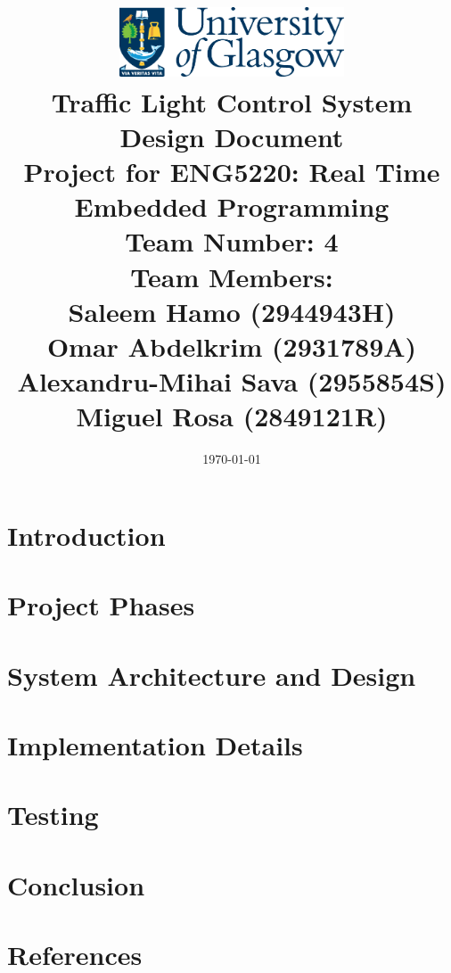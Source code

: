 \documentclass[12pt,a4paper]{article}
\title{
 \includegraphics[width=0.5\textwidth]{./images/UofG.png}\\[1cm]
  \Large \textbf{Traffic Light Control System Design Document} \\
  \large Project for ENG5220: Real Time Embedded Programming \\[1cm]
  \large Team Number: 4 \\[0.5cm]
  \normalsize Team Members: \\
  \normalsize Saleem Hamo (2944943H) \\
  \normalsize Omar Abdelkrim (2931789A) \\
  \normalsize Alexandru-Mihai Sava (2955854S) \\
  \normalsize Miguel Rosa (2849121R) \\
}
\date{\today}
\author{}
\begin{document}
\maketitle
\newpage

\tableofcontents
\newpage

\section{Introduction}

\newpage

\section{Project Phases}

\newpage

\section{System Architecture and Design}

\newpage


\section{Implementation Details}

\newpage

\section{Testing}

\newpage

\section{Conclusion}

\newpage

\section{References}
\end{document}
